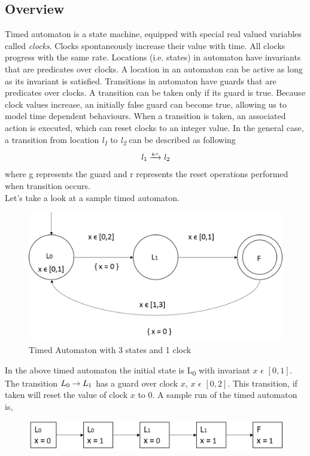 \documentclass[12pt,letterpaper]{report}
\begin{document}
\subsection{Overview}
Timed automaton is a state machine, equipped with special real valued variables called {\it clocks}. Clocks spontaneously increase their value with time. All clocks progress with the same rate. Locations (i.e. states) in automaton have invariants that are predicates over clocks. A location in an automaton can be active as long as its invariant is satisfied. Transitions in automaton have guards that are predicates over clocks. A transition can be taken only if its guard is true. Because clock values increase, an initially false guard can become true, allowing us to model time dependent behaviours. When a transition is taken, an associated action is executed, which can reset clocks to an integer value. In the general case, a transition from location {\it l\textsubscript{1}} to {\it l\textsubscript{2}} can be described as following
\begin{equation}
{\it l\textsubscript{1}}   \xrightarrow{\mbox{\tiny{g,r}}}  {\it l\textsubscript{2}}  
\end{equation}
where g represents the guard and r represents the reset operations performed when transition occurs.
\\
\indent Let's take a look at a sample timed automaton.
\begin{figure}[h!]
\begin{center}
\includegraphics[scale=0.7]{sampletimedautomaton.png}
\caption{Timed Automaton with 3 states and 1 clock}
\end{center}
\end{figure}

In the above timed automaton the initial state is L\textsubscript{0} with invariant $ x $ $\epsilon $ $[0,1]$. The transition $L\textsubscript{0} \rightarrow L\textsubscript{1} $ has a guard over clock $x$, $ x $ $\epsilon$ $[0,2]$. This transition, if taken will reset the value of clock $x$ to 0. A sample run of the timed automaton is, 
 \begin{figure}[h!]
\begin{center}
\includegraphics[scale=0.7]{sampletimedautomatonrun.png}
\end{center}
\end{figure}
\end{document}
